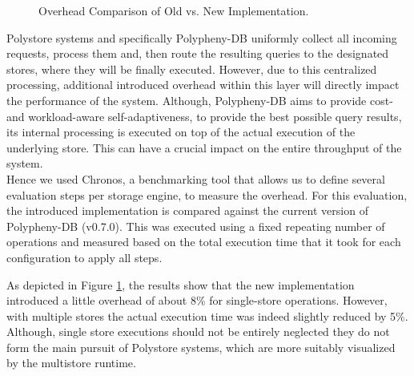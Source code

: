 \begin{figure}[t] 
    \centering 
\caption{Overhead Comparison of Old vs. New Implementation.}
\label{fig:overhead}
\end{figure}

Polystore systems and specifically Polypheny-DB uniformly collect all incoming requests, process them and, then
route the resulting queries to the designated stores, where they will be finally executed. 
However, due to this centralized processing, additional introduced overhead within this layer will directly impact the performance of the system.
Although, Polypheny-DB aims to provide cost- and workload-aware self-adaptiveness, to provide the best possible query results,
its internal processing is executed on top of the actual execution of the underlying store.
This can have a crucial impact on the entire throughput of the system.\\
Hence we used Chronos, a benchmarking tool that allows us to define several evaluation steps per storage engine,
to measure the overhead. For this evaluation, the introduced implementation is compared against the current version of Polypheny-DB (v0.7.0).
This was executed using a fixed repeating number of operations and measured based on the total execution time that it took for each configuration
to apply all steps.


As depicted in Figure \ref{fig:overhead}, the results show that the new implementation introduced a little overhead of about 8\% for single-store operations.
However, with multiple stores the actual execution time was indeed slightly reduced by 5\%. 
Although, single store executions should not be entirely neglected
they do not form the main pursuit of Polystore systems, which are more suitably visualized by the multistore runtime.





